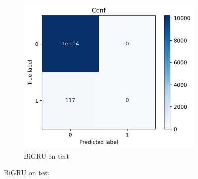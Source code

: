 \documentclass[utf8x]{ctexart}
\begin{document}
\begin{figure}[htb]
  \begin{subfigure}[b]{0.32\textwidth}
    \centering
    \includegraphics[width=\textwidth]{../images/BiGRU_test_conf.png}
    \caption{BiGRU on test}
    \label{fig:BiGRU_confusion_test}
  \end{subfigure}



\end{figure}
\end{document}
